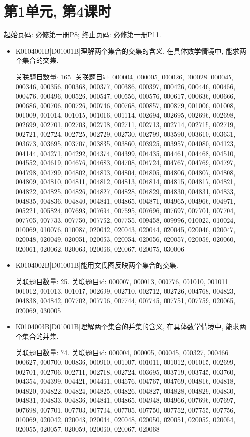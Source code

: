 \begin{itemize}
\end{itemize}

\section*{第1单元, 第4课时}
起始页码: 必修第一册P8; 终止页码: 必修第一册P11.
\begin{itemize}
\item K0104001B|D01001B|理解两个集合的交集的含义, 在具体数学情境中, 能求两个集合的交集.

关联题目数量: 165. 关联题目id: 000004, 000005, 000026, 000028, 000045, 000346, 000356, 000368, 000377, 000386, 000397, 000426, 000446, 000456, 000476, 000496, 000526, 000547, 000556, 000576, 000617, 000636, 000666, 000686, 000706, 000726, 000746, 000768, 000857, 000879, 001006, 001008, 001009, 001014, 001015, 001016, 001114, 002694, 002695, 002696, 002698, 002699, 002701, 002703, 002708, 002711, 002713, 002714, 002715, 002719, 002721, 002724, 002725, 002729, 002730, 002799, 003590, 003610, 003631, 003673, 003695, 003707, 003835, 003860, 003925, 003957, 004080, 004123, 004144, 004271, 004292, 004374, 004399, 004435, 004461, 004468, 004510, 004552, 004619, 004676, 004683, 004708, 004724, 004767, 004769, 004797, 004798, 004799, 004802, 004803, 004804, 004805, 004806, 004807, 004808, 004809, 004810, 004811, 004812, 004813, 004814, 004815, 004817, 004821, 004822, 004825, 004826, 004827, 004828, 004829, 004830, 004831, 004833, 004835, 004836, 004840, 004841, 004865, 004871, 004965, 004966, 004971, 005221, 005824, 007693, 007694, 007695, 007696, 007697, 007701, 007704, 007705, 007733, 007750, 007752, 007755, 009458, 009996, 010023, 010024, 010069, 010076, 010087, 020042, 020043, 020044, 020045, 020046, 020047, 020048, 020049, 020051, 020053, 020054, 020056, 020057, 020059, 020060, 020061, 020062, 020063, 020066, 020067, 020075, 030006

\item K0104002B|D01001B|能用文氏图反映两个集合的交集.

关联题目数量: 25. 关联题目id: 000007, 000013, 000776, 001010, 001011, 001012, 001013, 001017, 002699, 002710, 002712, 002726, 004768, 004823, 004838, 004842, 007702, 007706, 007744, 007745, 007751, 007759, 020065, 020069, 030005

\item K0104003B|D01001B|理解两个集合的并集的含义, 在具体数学情境中, 能求两个集合的并集.

关联题目数量: 74. 关联题目id: 000004, 000005, 000045, 000327, 000466, 000627, 000700, 000836, 000910, 001007, 001011, 001012, 001015, 002699, 002701, 002706, 002711, 002718, 002724, 003695, 003719, 003745, 003760, 004354, 004399, 004421, 004461, 004676, 004767, 004769, 004816, 004818, 004820, 004822, 004824, 004825, 004826, 004827, 004828, 004829, 004830, 004831, 004833, 004836, 004841, 004865, 004948, 004966, 007696, 007697, 007698, 007701, 007703, 007704, 007705, 007750, 007752, 007755, 007756, 010069, 020042, 020043, 020044, 020048, 020050, 020051, 020052, 020054, 020055, 020057, 020059, 020060, 020067, 020068


\end{itemize}
